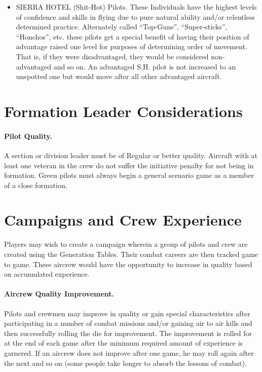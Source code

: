 \begin{advancedrules}
\begin{itemize}
    \item SIERRA HOTEL (Shit-Hot) Pilots. These Individuals have the highest levels of confidence and skills in flying due to pure natural ability and/or relentless determined practice. Alternately called “Top-Guns”, “Super-sticks”, “Honchos”, etc. these pilots get a special benefit of having their position of advantage raised one level for purposes of determining order of movement. That is, if they were disadvantaged, they would be considered non-advantaged and so on. An advantaged S.H. pilot is not increased to an unspotted one but would move after all other advantaged aircraft. 

\end{itemize}

\section{Formation Leader Considerations}

\paragraph{Pilot Quality.} A section or division leader must be of Regular or better quality. Aircraft with at least one veteran in the crew do not suffer the initiative penalty for not being in formation. Green pilots must always begin a general scenario game as a member of a close formation.

\section{Campaigns and Crew Experience}

Players may wish to create a campaign wherein a group of pilots and crew are created using the Generation Tables. Their combat careers are then tracked game to game. These aircrew would have the opportunity to increase in quality based on accumulated experience.

\paragraph{Aircrew Quality Improvement.} Pilots and crewmen may improve in quality or gain special characteristics after participating in a number of combat missions and/or gaining air to air kills and then successfully rolling the die for improvement. The improvement is rolled for at the end of each game after the minimum required amount of experience is garnered. If an aircrew does not improve after one game, he may roll again after the next and so on (some people take longer to absorb the lessons of combat).


\end{advancedrules}
